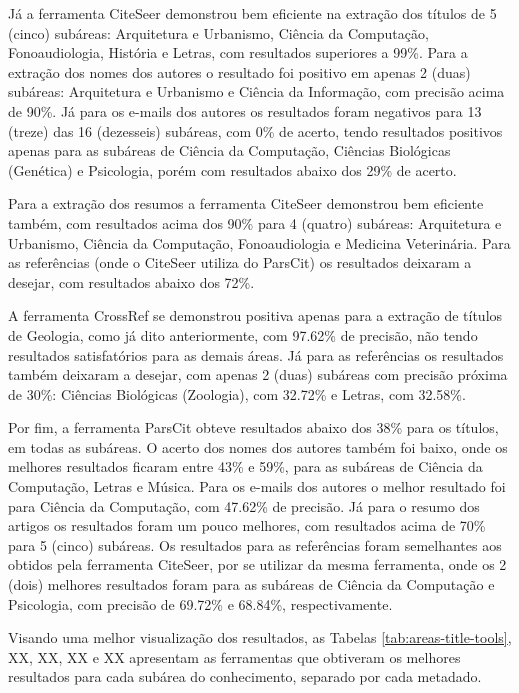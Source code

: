 Já a ferramenta CiteSeer demonstrou bem eficiente na extração dos títulos de 5 (cinco) subáreas: Arquitetura e Urbanismo, Ciência da Computação, Fonoaudiologia, História e Letras, com resultados superiores a 99\%. Para a extração dos nomes dos autores o resultado foi positivo em apenas 2 (duas) subáreas: Arquitetura e Urbanismo e Ciência da Informação, com precisão acima de 90\%. Já para os e-mails dos autores os resultados foram negativos para 13 (treze) das 16 (dezesseis) subáreas, com 0\% de acerto, tendo resultados positivos apenas para as subáreas de Ciência da Computação, Ciências Biológicas (Genética) e Psicologia, porém com resultados abaixo dos 29\% de acerto.

Para a extração dos resumos a ferramenta CiteSeer demonstrou bem eficiente também, com resultados acima dos 90\% para 4 (quatro) subáreas: Arquitetura e Urbanismo, Ciência da Computação, Fonoaudiologia e Medicina Veterinária. Para as referências (onde o CiteSeer utiliza do ParsCit) os resultados deixaram a desejar, com resultados abaixo dos 72\%.

A ferramenta CrossRef se demonstrou positiva apenas para a extração de títulos de Geologia, como já dito anteriormente, com 97.62\% de precisão, não tendo resultados satisfatórios para as demais áreas. Já para as referências os resultados também deixaram a desejar, com apenas 2 (duas) subáreas com precisão próxima de 30\%: Ciências Biológicas (Zoologia), com 32.72\% e Letras, com 32.58\%.

Por fim, a ferramenta ParsCit obteve resultados abaixo dos 38\% para os títulos, em todas as subáreas. O acerto dos nomes dos autores também foi baixo, onde os melhores resultados ficaram entre 43\% e 59\%, para as subáreas de Ciência da Computação, Letras e Música. Para os e-mails dos autores o melhor resultado foi para Ciência da Computação, com 47.62\% de precisão. Já para o resumo dos artigos os resultados foram um pouco melhores, com resultados acima de 70\% para 5 (cinco) subáreas. Os resultados para as referências foram semelhantes aos obtidos pela ferramenta CiteSeer, por se utilizar da mesma ferramenta, onde os 2 (dois) melhores resultados foram para as subáreas de Ciência da Computação e Psicologia, com precisão de 69.72\% e 68.84\%, respectivamente.

Visando uma melhor visualização dos resultados, as Tabelas \ref{tab:areas-title-tools}, XX, XX, XX e XX apresentam as ferramentas que obtiveram os melhores resultados para cada subárea do conhecimento, separado por cada metadado. 

